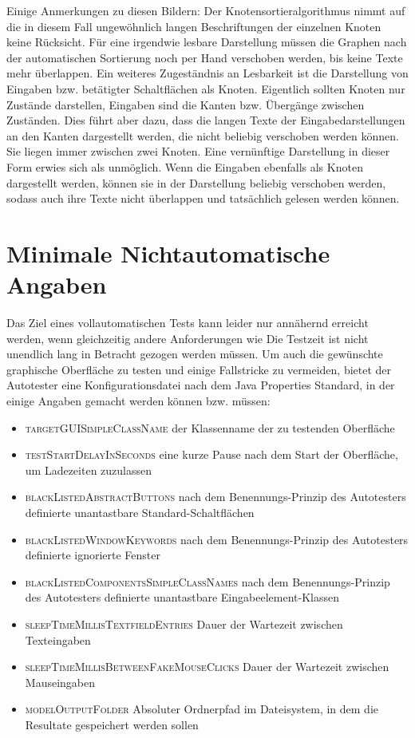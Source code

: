 Einige Anmerkungen zu diesen Bildern: Der Knotensortieralgorithmus
nimmt auf die in diesem Fall ungewöhnlich langen Beschriftungen der einzelnen
Knoten keine Rücksicht. Für eine irgendwie lesbare Darstellung müssen die
Graphen nach der automatischen Sortierung noch per Hand verschoben werden,
bis keine Texte mehr überlappen. Ein weiteres Zugeständnis an Lesbarkeit
ist die Darstellung von Eingaben bzw. betätigter Schaltflächen als
Knoten. Eigentlich sollten Knoten nur Zustände darstellen, Eingaben
sind die Kanten bzw. Übergänge zwischen Zuständen. Dies führt aber dazu,
dass die langen Texte der Eingabedarstellungen an den Kanten dargestellt
werden, die nicht beliebig verschoben werden können. Sie liegen immer
zwischen zwei Knoten. Eine vernünftige Darstellung in dieser Form
erwies sich als unmöglich. Wenn die Eingaben ebenfalls als Knoten
dargestellt werden, können sie in der Darstellung beliebig verschoben
werden, sodass auch ihre Texte nicht überlappen und tatsächlich
gelesen werden können.


\section{Minimale Nichtautomatische Angaben}

Das Ziel eines vollautomatischen Tests kann leider nur annähernd erreicht werden,
wenn gleichzeitig andere Anforderungen wie \glqq{}Die Testzeit ist nicht unendlich lang\grqq{}
in Betracht gezogen werden müssen. Um auch die gewünschte graphische Oberfläche zu
testen und einige Fallstricke zu vermeiden, bietet der Autotester eine Konfigurationsdatei
nach dem Java \glqq{}Properties\grqq{} Standard, in der einige Angaben gemacht werden können bzw. müssen:

\begin{itemize}
  \item \textsc{targetGUISimpleClassName} der Klassenname der zu testenden Oberfläche
  \item \textsc{testStartDelayInSeconds} eine kurze Pause nach dem Start der Oberfläche, um Ladezeiten zuzulassen
  \item \textsc{blackListedAbstractButtons} nach dem Benennungs-Prinzip des Autotesters definierte unantastbare Standard-Schaltflächen
  \item \textsc{blackListedWindowKeywords} nach dem Benennungs-Prinzip des Autotesters definierte ignorierte Fenster
  \item \textsc{blackListedComponentsSimpleClassNames} nach dem Benennungs-Prinzip des Autotesters definierte unantastbare Eingabeelement-Klassen
  \item \textsc{sleepTimeMillisTextfieldEntries} Dauer der Wartezeit zwischen Texteingaben
  \item \textsc{sleepTimeMillisBetweenFakeMouseClicks} Dauer der Wartezeit zwischen Mauseingaben
  \item \textsc{modelOutputFolder} Absoluter Ordnerpfad im Dateisystem, in dem die Resultate gespeichert werden sollen
\end{itemize}

